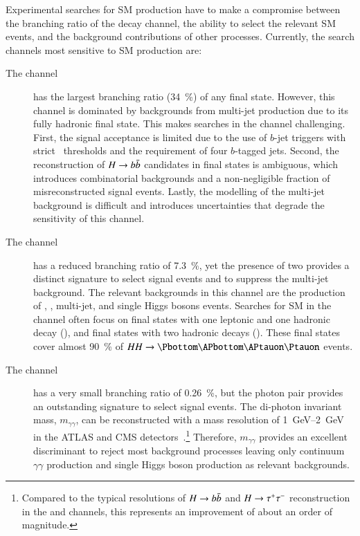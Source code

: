 Experimental searches for SM \HH production have to make a compromise between
the branching ratio of the decay channel, the ability to select the relevant SM
\HH events, and the background contributions of other processes. Currently, the
search channels most sensitive to SM \HH production are:
\begin{description}

\item[The \bbbb channel] has the largest branching ratio (\SI{34}{\percent}) of
  any final state. However, this channel is dominated by backgrounds from
  multi-jet production due to its fully hadronic final state. This makes
  searches in the \bbbb channel challenging. First, the signal acceptance is
  limited due to the use of $b$-jet triggers with strict \pT~thresholds and the
  requirement of four $b$-tagged jets. Second, the reconstruction of
  $H \to b\bar{b}$ candidates in \bbbb final states is ambiguous, which introduces
  combinatorial backgrounds and a non-negligible fraction of misreconstructed
  signal events. Lastly, the modelling of the multi-jet background is difficult
  and introduces uncertainties that degrade the sensitivity of this channel.

\item[The \bbtautau channel] has a reduced branching ratio of
  \SI{7.3}{\percent}, yet the presence of two \tauleptons provides a distinct
  signature to select signal events and to suppress the multi-jet
  background. The relevant backgrounds in this channel are the production of
  \ttbar, \Zjets, multi-jet, and single Higgs bosons events. Searches for SM \HH
  in the \bbtautau channel often focus on final states with one leptonic and one
  hadronic \taulepton decay (\lephad), and final states with two hadronic
  \taulepton decays (\hadhad). These final states cover almost \SI{90}{\percent}
  of $HH \to \bbtautau$ events.

\item[The \bbyy channel] has a very small branching ratio of
  \SI{0.26}{\percent}, but the photon pair provides an outstanding signature to
  select signal events. The di-photon invariant mass, $m_{\gamma\gamma}$, can be
  reconstructed with a mass resolution of \SIrange{1}{2}{\GeV} in the ATLAS and
  CMS detectors~\cite{PERF-2007-01,CMS-CMS-00-001}.\footnote{Compared to the
    typical resolutions of $H \to b\bar{b}$ and $H \to \tau^{+} \tau^{-}$ reconstruction in
    the \bbbb and \bbtautau channels, this represents an improvement of about an
    order of magnitude.} Therefore, $m_{\gamma\gamma}$ provides an excellent
  discriminant to reject most background processes leaving only continuum
  $\gamma\gamma$ production and single Higgs boson production as relevant
  backgrounds.

\end{description}

